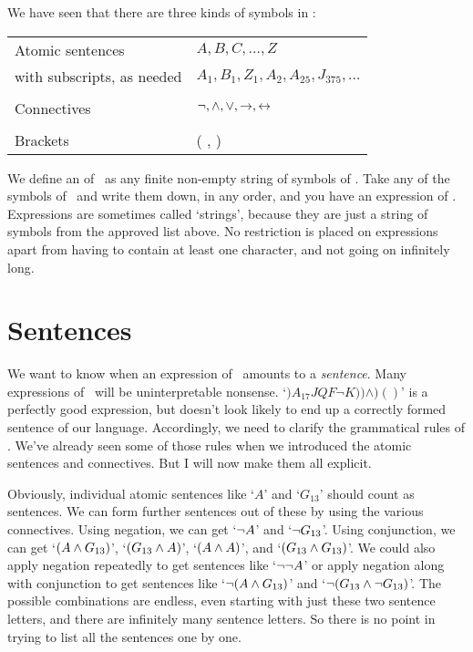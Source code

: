 We have seen that there are three kinds of symbols in \TFL:
\begin{center}
\begin{tabular}{l l} \toprule 
Atomic sentences & $A,B,C,…,Z$\\
with subscripts, as needed & $A_1, B_1,Z_1,A_2,A_{25},J_{375},…$\\
\\
Connectives & $\neg,\wedge,\vee,\rightarrow,\leftrightarrow$\\
\\
Brackets &( , )\\
\bottomrule \end{tabular} 
\end{center}
We define an  of \TFL\ as any finite non-empty string of symbols of \TFL. Take any of the symbols of \TFL\ and write them down, in any order, and you have an expression of \TFL. Expressions are sometimes called `strings', because they are just a string of symbols from the approved list above. No restriction is placed on expressions apart from having to contain at least one character, and not going on infinitely long.


\section{Sentences}\label{s.sentencesTFL}
We want to know when an expression of \TFL\ amounts to a \emph{sentence}. Many expressions of \TFL\ will be uninterpretable nonsense. `$)A_{17}JQF¬K))\wedge)()$' is a perfectly good expression, but doesn't look likely to end up a correctly formed sentence of our language.  Accordingly, we need to clarify the grammatical rules of \TFL. We've already seen some of those rules when we introduced the atomic sentences and connectives. But I will now make them all explicit. 

Obviously, individual atomic sentences like `$A$' and `$G_{13}$' should count as sentences. We can form further sentences out of these by using the various connectives. Using negation, we can get `$\neg A$' and `$\neg G_{13}$'. Using conjunction, we can get `$(A \wedge G_{13})$', `$(G_{13} \wedge A)$', `$(A \wedge A)$', and `$(G_{13} \wedge G_{13})$'. We could also apply negation repeatedly to get sentences like `$\neg \neg A$' or apply negation along with conjunction to get sentences like `$\neg(A \wedge G_{13})$' and `$\neg(G_{13} \wedge \neg G_{13})$'. The possible combinations are endless, even starting with just these two sentence letters, and there are infinitely many sentence letters. So there is no point in trying to list all the sentences one by one.

